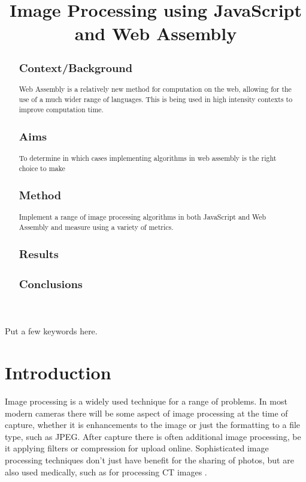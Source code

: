 \documentclass[12pt,a4paper]{article}
\title{Image Processing using JavaScript and Web Assembly}
\author{} %
\date{}
\begin{document}
\maketitle

\begin{abstract}
    \subsection{Context/Background}
    Web Assembly is a relatively new method for computation on the web, allowing for the use of a much wider range of languages. This is being used in high intensity contexts to improve computation time.

    \subsection{Aims}

    To determine in which cases implementing algorithms in web assembly is the right choice to make

    \subsection{Method}

    Implement a range of image processing algorithms in both JavaScript and Web Assembly and measure using a variety of metrics.

    \subsection{Results}

    \subsection{Conclusions}
\end{abstract}

\begin{keywords}
    Put a few keywords here.
\end{keywords}


\section{Introduction}

Image processing is a widely used technique for a range of problems. In most modern cameras there will be some aspect of image processing at the time of capture, whether it is enhancements to the image or just the formatting to a file type, such as JPEG. After capture there is often additional image processing, be it applying filters or compression for upload online. Sophisticated image processing techniques don't just have benefit for the sharing of photos, but are also used medically, such as for processing CT images \cite{zhang2017applications}.
\end{document}
